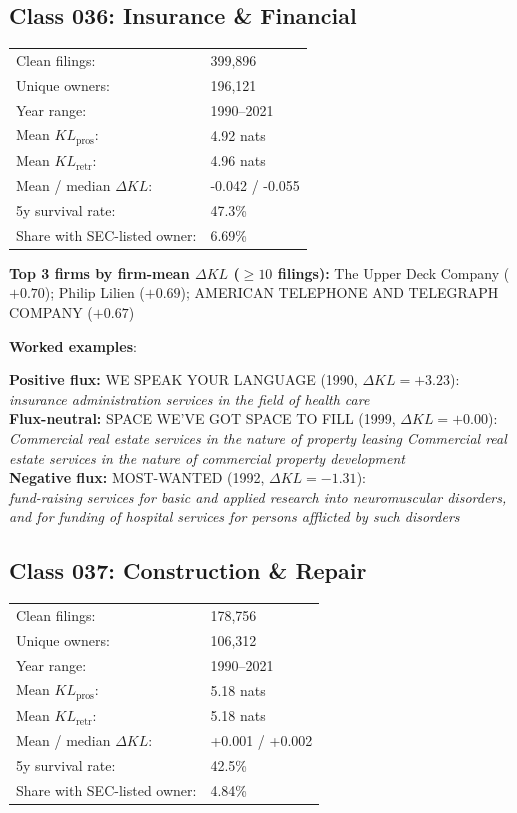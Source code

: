 \subsection*{Class 036: Insurance \& Financial}
\label{app:industry-036}

\begin{tabular}{ll}
Clean filings: & 399,896 \\
Unique owners: & 196,121 \\
Year range: & 1990--2021 \\
Mean $KL_\text{pros}$: & 4.92 nats \\
Mean $KL_\text{retr}$: & 4.96 nats \\
Mean / median $\Delta KL$: & -0.042 / -0.055 \\
5y survival rate: & 47.3\% \\
Share with SEC-listed owner: & 6.69\% \\
\end{tabular}

\textbf{Top 3 firms by firm-mean $\Delta KL$ ($\geq 10$ filings):} The Upper Deck Company ($+0.70$); Philip Lilien ($+0.69$); AMERICAN TELEPHONE AND TELEGRAPH COMPANY ($+0.67$)

\textbf{Worked examples}:

  \textbf{Positive flux:} \textsc{WE SPEAK YOUR LANGUAGE} (1990, $\Delta KL=+3.23$):\\
  \textit{insurance administration services in the field of health care}\\
  \textbf{Flux-neutral:} \textsc{SPACE WE'VE GOT SPACE TO FILL} (1999, $\Delta KL=+0.00$):\\
  \textit{Commercial real estate services in the nature of property leasing Commercial real estate services in the nature of commercial property development}\\
  \textbf{Negative flux:} \textsc{MOST-WANTED} (1992, $\Delta KL=-1.31$):\\
  \textit{fund-raising services for basic and applied research into neuromuscular disorders, and for funding of hospital services for persons afflicted by such disorders}\\

\subsection*{Class 037: Construction \& Repair}
\label{app:industry-037}

\begin{tabular}{ll}
Clean filings: & 178,756 \\
Unique owners: & 106,312 \\
Year range: & 1990--2021 \\
Mean $KL_\text{pros}$: & 5.18 nats \\
Mean $KL_\text{retr}$: & 5.18 nats \\
Mean / median $\Delta KL$: & +0.001 / +0.002 \\
5y survival rate: & 42.5\% \\
Share with SEC-listed owner: & 4.84\% \\
\end{tabular}

